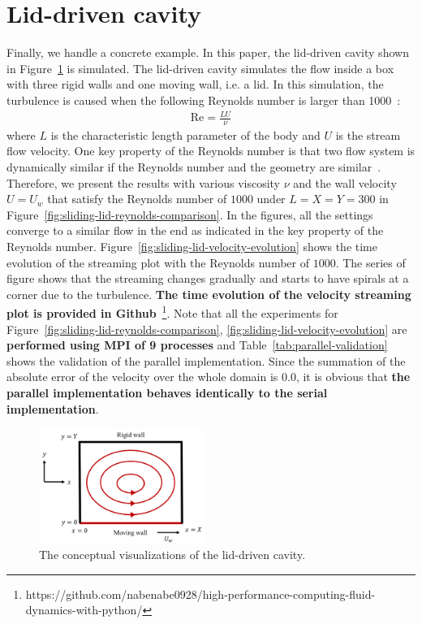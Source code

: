 \section{Lid-driven cavity}
Finally, we handle a concrete example.
In this paper, the lid-driven cavity shown in Figure~\ref{lid-driven-cavity-conceptual} is simulated.
The lid-driven cavity simulates the flow inside a box with
three rigid walls and one moving wall, i.e. a lid.
In this simulation, the turbulence is caused 
when the following Reynolds number is larger than 1000~\cite{chiang1998effect}:
\begin{equation}
\begin{aligned}
  \text{Re} = \frac{LU}{\nu}
\end{aligned}
\end{equation}
where $L$ is the characteristic length parameter
of the body and $U$ is the stream flow velocity.
One key property of the Reynolds number is that two flow system
is dynamically similar if the Reynolds number and the geometry are similar~\cite{kundu2008fluid}.
Therefore, we present the results with various 
viscosity $\nu$ and the wall velocity $U = U_w$ that 
satisfy the Reynolds number of $1000$ under $L = X = Y = 300$
in Figure~\ref{fig:sliding-lid-reynolds-comparison}.
In the figures, all the settings converge to a similar flow in the end
as indicated in the key property of the Reynolds number.
Figure~\ref{fig:sliding-lid-velocity-evolution} shows the time evolution of
the streaming plot with the Reynolds number of $1000$.
The series of figure shows that the streaming changes gradually
and starts to have spirals at a corner due to the turbulence.
{\bf The time evolution of the velocity streaming plot is provided in
Github}~\footnote{https://github.com/nabenabe0928/high-performance-computing-fluid-dynamics-with-python/}.
Note that all the experiments for
Figure~\ref{fig:sliding-lid-reynolds-comparison}, \ref{fig:sliding-lid-velocity-evolution}
are {\bf performed using MPI of 9 processes}
and Table~\ref{tab:parallel-validation}
shows the validation of the parallel implementation.
Since the summation of the absolute error of the velocity over the whole domain
is $0.0$, it is obvious that
{\bf the parallel implementation behaves identically to the serial implementation}.

\begin{figure}[t]
  \vspace{-7mm}
  \centering
  \includegraphics[width=0.48\textwidth]{imgs/lid-driven-cavity.pdf}
  \vspace{-3mm}
  \caption{The conceptual visualizations of the lid-driven cavity.}
  \label{lid-driven-cavity-conceptual}
  \vspace{-3mm}
\end{figure}

